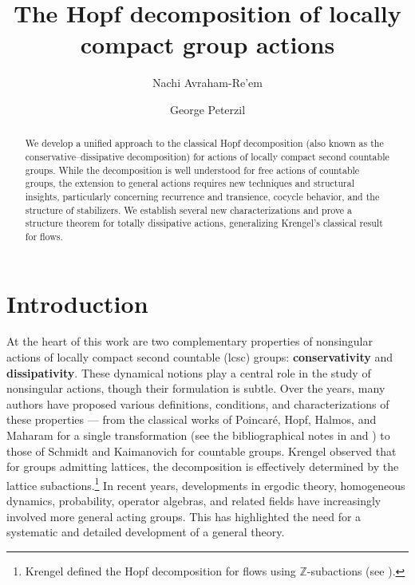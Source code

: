 \documentclass{amsart}
\author{Nachi Avraham-Re'em}
\author{George Peterzil}
\title{The Hopf decomposition of locally compact group actions}
\numberwithin{equation}{subsection}
\begin{document}
\begin{abstract}
We develop a unified approach to the classical Hopf decomposition (also known as the conservative--dissipative decomposition) for actions of locally compact second countable groups. While the decomposition is well understood for free actions of countable groups, the extension to general actions requires new techniques and structural insights, particularly concerning recurrence and transience, cocycle behavior, and the structure of stabilizers. We establish several new characterizations and prove a structure theorem for totally dissipative actions, generalizing Krengel’s classical result for flows.
\end{abstract}

\maketitle


\tableofcontents

\section{Introduction}

At the heart of this work are two complementary properties of nonsingular actions of locally compact second countable (lcsc) groups: \textbf{conservativity} and \textbf{dissipativity}. These dynamical notions play a central role in the study of nonsingular actions, though their formulation is subtle. Over the years, many authors have proposed various definitions, conditions, and characterizations of these properties — from the classical works of Poincar\'e, Hopf, Halmos, and Maharam for a single transformation (see the bibliographical notes in \cite[\S1.3]{krengel1985ergodic} and \cite[\S1.1]{aaronson1997introduction}) to those of Schmidt \cite[\S1]{schmidt1977cocycles} and Kaimanovich \cite[\S1.1]{kaimanovich1994ergodicity, kaimanovich2010hopf} for countable groups. Krengel observed that for groups admitting lattices, the decomposition is effectively determined by the lattice subactions.\footnote{Krengel defined the Hopf decomposition for flows using \(\mathbb{Z}\)-subactions (see \cite[Lemma 2.7]{krengel1969II}).} In recent years, developments in ergodic theory, homogeneous dynamics, probability, operator algebras, and related fields have increasingly involved more general acting groups. This has highlighted the need for a systematic and detailed development of a general theory.
\end{document}
